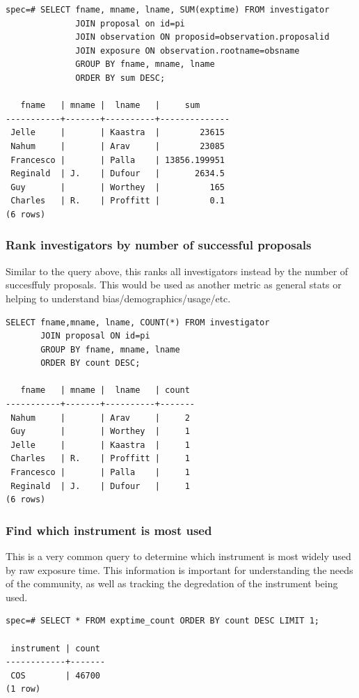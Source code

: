 \documentclass[a4paper,11pt]{article}
\begin{document}
\begin{verbatim}
spec=# SELECT fname, mname, lname, SUM(exptime) FROM investigator 
              JOIN proposal on id=pi 
              JOIN observation ON proposid=observation.proposalid 
              JOIN exposure ON observation.rootname=obsname 
              GROUP BY fname, mname, lname 
              ORDER BY sum DESC;

   fname   | mname |  lname   |     sum      
-----------+-------+----------+--------------
 Jelle     |       | Kaastra  |        23615
 Nahum     |       | Arav     |        23085
 Francesco |       | Palla    | 13856.199951
 Reginald  | J.    | Dufour   |       2634.5
 Guy       |       | Worthey  |          165
 Charles   | R.    | Proffitt |          0.1
(6 rows)
\end{verbatim}

\subsubsection{Rank investigators by number of successful proposals}
Similar to the query above, this ranks all investigators instead by the number of succesffuly proposals.  This would be used as another metric as general stats or helping to understand bias/demographics/usage/etc.  

\begin{verbatim}
SELECT fname,mname, lname, COUNT(*) FROM investigator 
       JOIN proposal ON id=pi 
       GROUP BY fname, mname, lname 
       ORDER BY count DESC;

   fname   | mname |  lname   | count 
-----------+-------+----------+-------
 Nahum     |       | Arav     |     2
 Guy       |       | Worthey  |     1
 Jelle     |       | Kaastra  |     1
 Charles   | R.    | Proffitt |     1
 Francesco |       | Palla    |     1
 Reginald  | J.    | Dufour   |     1
(6 rows)

\end{verbatim}

\subsubsection{Find which instrument is most used}
This is a very common query to determine which instrument is most widely used by raw exposure time.  This information is important for understanding the needs of the community, as well as tracking the degredation of the instrument being used.

\begin{verbatim}
spec=# SELECT * FROM exptime_count ORDER BY count DESC LIMIT 1;

 instrument | count 
------------+-------
 COS        | 46700
(1 row)
\end{verbatim}
\end{document}
